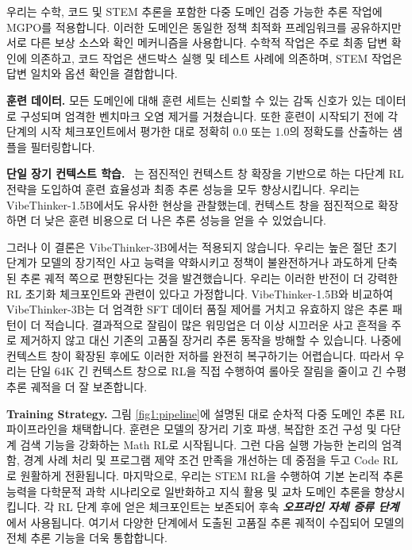 \documentclass{article}
\begin{document}
우리는 수학, 코드 및 STEM 추론을 포함한 다중 도메인 검증 가능한 추론 작업에 MGPO를 적용합니다. 이러한 도메인은 동일한 정책 최적화 프레임워크를 공유하지만 서로 다른 보상 소스와 확인 메커니즘을 사용합니다. 수학적 작업은 주로 최종 답변 확인에 의존하고, 코드 작업은 샌드박스 실행 및 테스트 사례에 의존하며, STEM 작업은 답변 일치와 옵션 확인을 결합합니다.

\textbf{훈련 데이터.} 모든 도메인에 대해 훈련 세트는 신뢰할 수 있는 감독 신호가 있는 데이터로 구성되며 엄격한 벤치마크 오염 제거를 거쳤습니다. 또한 훈련이 시작되기 전에 각 단계의 시작 체크포인트에서 평가한 대로 정확히 0.0 또는 1.0의 정확도를 산출하는 샘플을 필터링합니다.

\textbf{단일 장기 컨텍스트 학습.} ~\cite{luo2025deepscaler}는 점진적인 컨텍스트 창 확장을 기반으로 하는 다단계 RL 전략을 도입하여 훈련 효율성과 최종 추론 성능을 모두 향상시킵니다. 우리는 VibeThinker-1.5B에서도 유사한 현상을 관찰했는데, 컨텍스트 창을 점진적으로 확장하면 더 낮은 훈련 비용으로 더 나은 추론 성능을 얻을 수 있었습니다.

그러나 이 결론은 VibeThinker-3B에서는 적용되지 않습니다. 우리는 높은 절단 초기 단계가 모델의 장기적인 사고 능력을 약화시키고 정책이 불완전하거나 과도하게 단축된 추론 궤적 쪽으로 편향된다는 것을 발견했습니다. 우리는 이러한 반전이 더 강력한 RL 초기화 체크포인트와 관련이 있다고 가정합니다. VibeThinker-1.5B와 비교하여 VibeThinker-3B는 더 엄격한 SFT 데이터 품질 제어를 거치고 유효하지 않은 추론 패턴이 더 적습니다. 결과적으로 잘림이 많은 워밍업은 더 이상 시끄러운 사고 흔적을 주로 제거하지 않고 대신 기존의 고품질 장거리 추론 동작을 방해할 수 있습니다. 나중에 컨텍스트 창이 확장된 후에도 이러한 저하를 완전히 복구하기는 어렵습니다. 따라서 우리는 단일 64K 긴 컨텍스트 창으로 RL을 직접 수행하여 롤아웃 잘림을 줄이고 긴 수평 추론 궤적을 더 잘 보존합니다.


\textbf{Training Strategy.} 그림 \ref{fig1:pipeline}에 설명된 대로 순차적 다중 도메인 추론 RL 파이프라인을 채택합니다. 훈련은 모델의 장거리 기호 파생, 복잡한 조건 구성 및 다단계 검색 기능을 강화하는 Math RL로 시작됩니다. 그런 다음 실행 가능한 논리의 엄격함, 경계 사례 처리 및 프로그램 제약 조건 만족을 개선하는 데 중점을 두고 Code RL로 원활하게 전환됩니다. 마지막으로, 우리는 STEM RL을 수행하여 기본 논리적 추론 능력을 다학문적 과학 시나리오로 일반화하고 지식 활용 및 교차 도메인 추론을 향상시킵니다. 각 RL 단계 후에 얻은 체크포인트는 보존되어 후속 \textbf{\textit{오프라인 자체 증류 단계}}에서 사용됩니다. 여기서 다양한 단계에서 도출된 고품질 추론 궤적이 수집되어 모델의 전체 추론 기능을 더욱 통합합니다.
\end{document}
